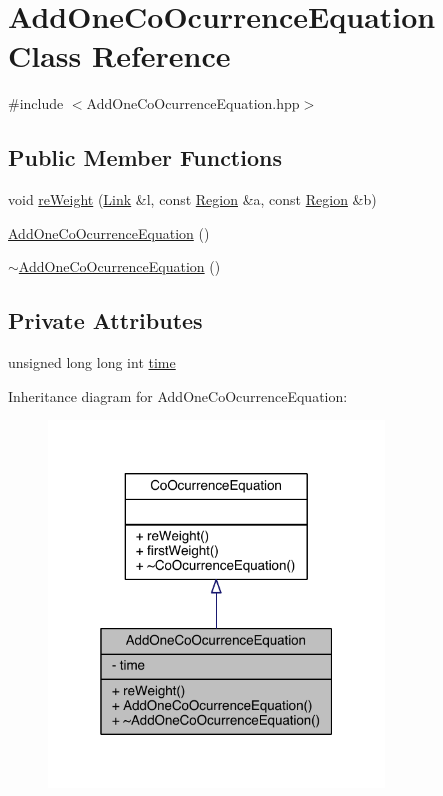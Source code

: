 \hypertarget{class_add_one_co_ocurrence_equation}{\section{Add\+One\+Co\+Ocurrence\+Equation Class Reference}
\label{class_add_one_co_ocurrence_equation}
}


{\ttfamily \#include $<$Add\+One\+Co\+Ocurrence\+Equation.\+hpp$>$}

\subsection*{Public Member Functions}
\begin{DoxyCompactItemize}
\item 
void \hyperlink{class_add_one_co_ocurrence_equation_ad75e50bbad4ba1f6c160e3a7059c1aca}{re\+Weight} (\hyperlink{class_link}{Link} \&l, const \hyperlink{class_region}{Region} \&a, const \hyperlink{class_region}{Region} \&b)
\item 
\hyperlink{class_add_one_co_ocurrence_equation_a13fb88aa8f85bbed226e660cfdb4108c}{Add\+One\+Co\+Ocurrence\+Equation} ()
\item 
\hyperlink{class_add_one_co_ocurrence_equation_aef4986b76639a232182fde519b18a6f6}{$\sim$\+Add\+One\+Co\+Ocurrence\+Equation} ()
\end{DoxyCompactItemize}
\subsection*{Private Attributes}
\begin{DoxyCompactItemize}
\item 
unsigned long long int \hyperlink{class_add_one_co_ocurrence_equation_acc5d13016d7aad2a3937d31552058997}{time}
\end{DoxyCompactItemize}


Inheritance diagram for Add\+One\+Co\+Ocurrence\+Equation\+:
\nopagebreak
\begin{figure}[H]
\begin{center}
\leavevmode
\includegraphics[width=253pt]{class_add_one_co_ocurrence_equation__inherit__graph}
\end{center}
\end{figure}


